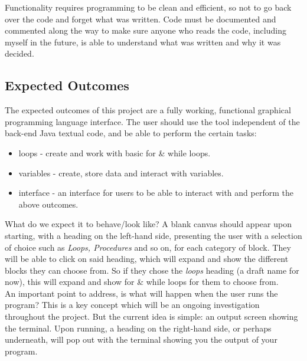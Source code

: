 \documentclass[a4paper, 12pt]{article}
\begin{document}
            Functionality requires programming to be clean and efficient, so not to go back over the code 
            and forget what was written. Code must be documented and commented along the way to make sure 
            anyone who reads the code, including myself in the future, is able to understand what was 
            written and why it was decided.

            \subsection{Expected Outcomes}
            The expected outcomes of this project are a fully working, functional graphical programming 
            language interface. The user should use the tool independent of the back-end Java textual 
            code, and be able to perform the certain tasks:

            \begin{itemize}
                \item loops - create and work with basic for \& while loops.
                \item variables - create, store data and interact with variables.
                \item interface - an interface for users to be able to interact with and perform the
                above outcomes.
            \end{itemize}

            What do we expect it to behave/look like? A blank canvas should appear upon starting, with
            a heading on the left-hand side, presenting the user with a selection of choice such as
            \textit{Loops, Procedures} and so on, for each category of block. They will be able to click
            on said heading, which will expand and show the different blocks they can choose from. So if
            they chose the \textit{loops} heading (a draft name for now), this will expand and show
            for \& while loops for them to choose from. \\

            An important point to address, is what will happen when the user runs the program? This is a key
            concept which will be an ongoing investigation throughout the project. But the current idea is
            simple: an output screen showing the terminal. Upon running, a heading on the right-hand side,
            or perhaps underneath, will pop out with the terminal showing you the output of your program.
\end{document}
